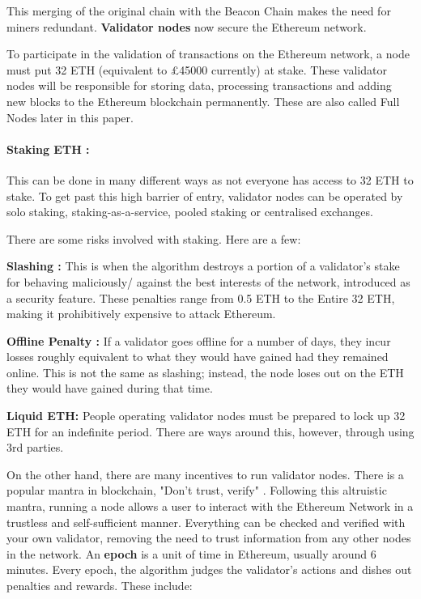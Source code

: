 This merging of the original chain with the Beacon Chain makes the need for miners redundant. \textbf{Validator nodes} now secure the Ethereum network. 

To participate in the validation of transactions on the Ethereum network, a node must put 32 ETH (equivalent to £45000 currently) at stake. These validator nodes will be responsible for storing data, processing transactions and adding new blocks to the Ethereum blockchain permanently. These are also called Full Nodes later in this paper.

\paragraph{Staking ETH :}
This can be done in many different ways as not everyone has access to 32 ETH to stake. To get past this high barrier of entry, validator nodes can be operated by solo staking, staking-as-a-service, pooled staking or centralised exchanges.

There are some risks involved with staking. Here are a few:

\textbf{Slashing :}
This is when the algorithm destroys a portion of a validator's stake for behaving maliciously/ against the best interests of the network, introduced as a security feature. These penalties range from 0.5 ETH to the Entire 32 ETH, making it prohibitively expensive to attack Ethereum. 

\textbf{Offline Penalty :}
If a validator goes offline for a number of days, they incur losses roughly equivalent to what they would have gained had they remained online. This is not the same as slashing; instead, the node loses out on the ETH they would have gained during that time.

\textbf{Liquid ETH: }
People operating validator nodes must be prepared to lock up 32 ETH for an indefinite period. There are ways around this, however, through using 3rd parties. 
 
On the other hand, there are many incentives to run validator nodes. There is a popular mantra in blockchain, "Don't trust, verify" \cite{EthereumEthereum.org}. Following this altruistic mantra, running a node allows a user to interact with the Ethereum Network in a trustless and self-sufficient manner. Everything can be checked and verified with your own validator, removing the need to trust information from any other nodes in the network. An \textbf{epoch} is a unit of time in Ethereum, usually around 6 minutes. Every epoch, the algorithm judges the validator's actions and dishes out penalties and rewards. These include:

